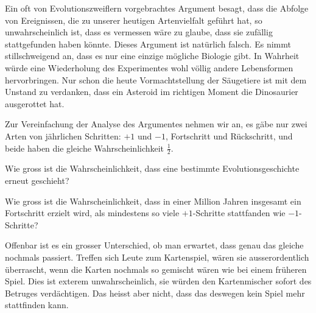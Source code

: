 Ein oft von Evolutionszweiflern vorgebrachtes Argument besagt, dass
die Abfolge von Ereignissen, die zu unserer heutigen Artenvielfalt
geführt hat, so unwahrscheinlich ist, dass es vermessen wäre zu
glaube, dass sie zufällig stattgefunden haben könnte. Dieses Argument
ist natürlich falsch. Es nimmt stillschweigend an, dass es nur eine
einzige mögliche Biologie gibt. In Wahrheit würde eine Wiederholung des
Experimentes wohl völlig andere Lebensformen hervorbringen. Nur schon
die heute Vormachtstellung der Säugetiere ist mit dem Unstand zu
verdanken, dass ein Asteroid im richtigen Moment die Dinosaurier
ausgerottet hat.

Zur Vereinfachung der Analyse des Argumentes nehmen wir an, es gäbe nur
zwei Arten von jährlichen Schritten: $+1$ und $-1$, Fortschritt und
Rückschritt,
und beide haben die gleiche Wahrscheinlichkeit $\frac12$.
\begin{teilaufgaben}
\item
Wie gross ist
die Wahrscheinlichkeit, dass eine bestimmte Evolutionsgeschichte erneut
geschieht?
\item Wie gross ist die Wahrscheinlichkeit, dass in einer Million
Jahren insgesamt ein Fortschritt erzielt wird, als mindestens so viele $+1$-Schritte stattfanden wie $-1$-Schritte?
\end{teilaufgaben}

Offenbar ist es ein grosser Unterschied, ob man erwartet, dass genau
das gleiche nochmals passiert. Treffen sich Leute zum Kartenspiel,
wären sie ausserordentlich überrascht, wenn die Karten nochmals so
gemischt wären wie bei einem früheren Spiel. Dies ist exterem
unwahrscheinlich, sie würden den Kartenmischer sofort des Betruges
verdächtigen. Das heisst aber nicht, dass das deswegen kein Spiel mehr
stattfinden kann.


